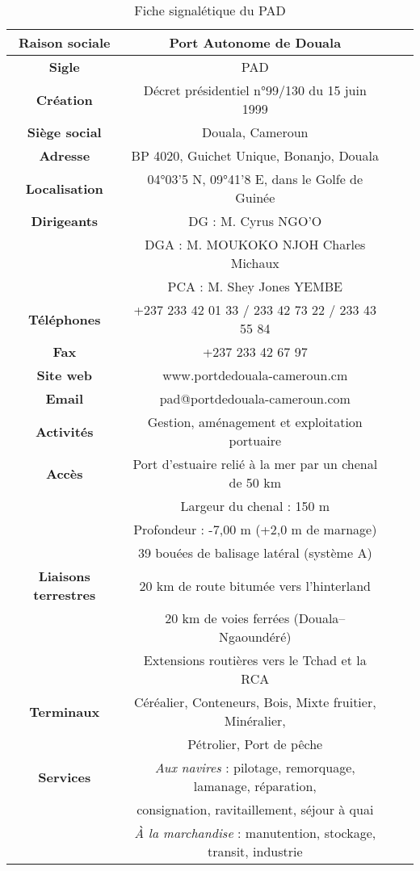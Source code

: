 \documentclass[a4paper,12pt,openany]{report}
\begin{document}
	\begin{table}[htbp]
		\centering
		\caption{Fiche signalétique du PAD}
		\begin{tabular}{|c|c|c|p{7cm}|}
			\hline
			\textbf{Raison sociale} & Port Autonome de Douala \\
			\hline
			\textbf{Sigle} & PAD \\
			\hline
			\textbf{Création} & Décret présidentiel n°99/130 du 15 juin 1999 \\
			\hline
			\textbf{Siège social} & Douala, Cameroun \\
			\hline
			\textbf{Adresse} & BP 4020, Guichet Unique, Bonanjo, Douala \\
			\hline
			\textbf{Localisation} & 04°03’5 N, 09°41’8 E, dans le Golfe de Guinée \\
			\hline
			\textbf{Dirigeants} & DG : M. Cyrus NGO’O \\
			& DGA : M. MOUKOKO NJOH Charles Michaux \\
			& PCA : M. Shey Jones YEMBE \\
			\hline
			\textbf{Téléphones} & +237 233 42 01 33 / 233 42 73 22 / 233 43 55 84 \\
			\hline
			\textbf{Fax} & +237 233 42 67 97 \\
			\hline
			\textbf{Site web} & www.portdedouala-cameroun.cm \\
			\hline
			\textbf{Email} & pad@portdedouala-cameroun.com \\
			\hline
			\textbf{Activités} & Gestion, aménagement et exploitation portuaire \\
			\textbf{Accès} & Port d’estuaire relié à la mer par un chenal de 50 km \\
			& Largeur du chenal : 150 m \\
			& Profondeur : -7,00 m (+2,0 m de marnage) \\
			& 39 bouées de balisage latéral (système A) \\
			\hline
			\textbf{Liaisons terrestres} & 20 km de route bitumée vers l’hinterland \\
			& 20 km de voies ferrées (Douala–Ngaoundéré) \\
			& Extensions routières vers le Tchad et la RCA \\
			\hline
			\textbf{Terminaux} & Céréalier, Conteneurs, Bois, Mixte fruitier, Minéralier, \\
			& Pétrolier, Port de pêche \\
			\hline
			\textbf{Services} & \textit{Aux navires} : pilotage, remorquage, lamanage, réparation, \\
			& consignation, ravitaillement, séjour à quai \\
			& \textit{À la marchandise} : manutention, stockage, transit, industrie \\
			\hline
		\end{tabular}
		\label{tab:douala_accidents}
	\end{table}
	
\end{document}
